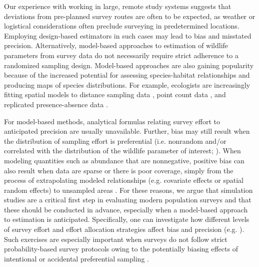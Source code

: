 \documentclass[]{rsos}%
\begin{document}
Our experience with working in large, remote study systems suggests that deviations from pre-planned survey routes are often to be expected, as weather or logistical considerations often preclude surveying in predetermined locations. Employing design-based estimators in such cases may lead to bias and misstated precision.  Alternatively, model-based approaches to estimation of wildlife parameters from survey data do not necessarily require strict adherence to a randomized sampling design. Model-based approaches are also gaining popularity because of the increased potential for assessing species-habitat relationships and producing maps of species distributions.  For example, ecologists are increasingly fitting spatial models to distance sampling data \cite{HedleyBuckland2004,JohnsonEtAl2010,MillerEtAl2013}, point count data \cite{Royle2004a,ChandlerEtAl2011}, and replicated presence-absence data \cite{JohnsonEtAl2013}.

For model-based methods, analytical formulas relating survey effort to anticipated precision are usually unavailable. Further, bias may still result when the distribution of sampling effort is preferential (i.e. nonrandom and/or correlated with the distribution of the wildlife parameter of interest; \cite{DiggleEtAl2010,PatiEtAl2011}).  When modeling quantities such as abundance that are nonnegative, positive bias can also result when data are sparse or there is poor coverage, simply from the process of extrapolating modeled relationships (e.g. covariate effects or spatial random effects) to unsampled areas \cite{ConnEtAl2015b}.
For these reasons, we argue that simulation studies are a critical first step in evaluating modern population surveys and that these should be conducted in advance, especially when a model-based approach to estimation is anticipated.  Specifically, one can investigate how different levels of survey effort and effort allocation strategies affect bias and precision (e.g. \cite{StrindbergEtAl2004,NielsenEtAl2013,SanderlinEtAl2014,PeelEtAl2015}). Such exercises are especially important when surveys do not follow strict probability-based survey protocols owing to the potentially biasing effects of intentional or accidental preferential sampling \cite{DiggleEtAl2010,PatiEtAl2011}.
\end{document}
